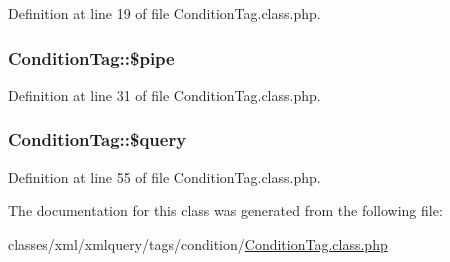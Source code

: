 Definition at line 19 of file Condition\+Tag.\+class.\+php.

\subsubsection[{\texorpdfstring{\$pipe}{$pipe}}]{\setlength{\rightskip}{0pt plus 5cm}Condition\+Tag\+::\$pipe}\hypertarget{classConditionTag_a52a8251ff965af25e284262fab02f7f5}{}\label{classConditionTag_a52a8251ff965af25e284262fab02f7f5}


Definition at line 31 of file Condition\+Tag.\+class.\+php.

\subsubsection[{\texorpdfstring{\$query}{$query}}]{\setlength{\rightskip}{0pt plus 5cm}Condition\+Tag\+::\$query}\hypertarget{classConditionTag_ab186510e6366ad1033cc9d73cedf1f02}{}\label{classConditionTag_ab186510e6366ad1033cc9d73cedf1f02}


Definition at line 55 of file Condition\+Tag.\+class.\+php.



The documentation for this class was generated from the following file\+:\begin{DoxyCompactItemize}
\item 
classes/xml/xmlquery/tags/condition/\hyperlink{ConditionTag_8class_8php}{Condition\+Tag.\+class.\+php}\end{DoxyCompactItemize}
